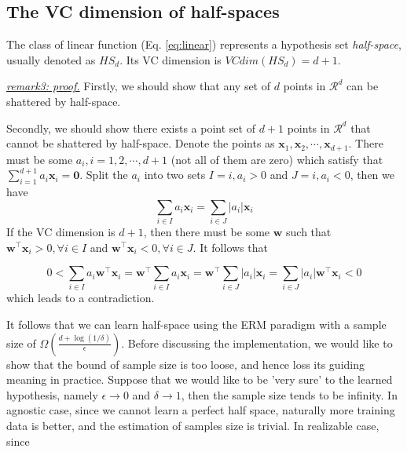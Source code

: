 \documentclass{article}
\begin{document}
	\subsection{The VC dimension of half-spaces}
	
	The class of linear function (Eq. \ref{eq:linear}) represents a hypothesis set  \textit{half-space}, usually denoted as $HS_d$. Its VC dimension is $VCdim(HS_d)=d+1$.  

	\vspace{2mm}
	\begin{scriptsize}
	\begin{spacing}{1.2}
	{\sffamily
	\noindent\textit{\underline{remark3: proof.}} Firstly, we should show that any set of $d$ points in $\mathcal{R}^d$ can be shattered by half-space. 
	
	Secondly, we should show there exists a point set of $d+1$ points in $\mathcal{R}^{d}$ that cannot be shattered by half-space. Denote the points as $\mathbf{x}_1, \mathbf{x}_2, \cdots, \mathbf{x}_{d+1}$. There must be some $a_i, i=1,2,\cdots,d+1$ (not all of them are zero) which satisfy that $\sum_{i=1}^{d+1} a_i \mathbf{x}_i = \mathbf{0}$. Split the $a_i$ into two sets $I={i,a_i>0}$ and $J={i,a_i<0}$, then we have 
	\begin{equation*}
	\sum_{i\in I} a_i \mathbf{x}_i = \sum_{i \in J} |a_i| \mathbf{x}_i
	\end{equation*}
If the VC dimension is $d+1$, then there must be some $\mathbf{w}$ such that $\mathbf{w}^\top \mathbf{x}_i > 0, \forall i \in I$ and $\mathbf{w}^\top \mathbf{x}_i < 0, \forall i \in J$. It follows that
	
	\begin{equation*}
	0 < \sum_{i \in I} a_i \mathbf{w}^\top \mathbf{x}_i = \mathbf{w}^\top  \sum_{i \in I} a_i \mathbf{x}_i = \mathbf{w}^\top  \sum_{i \in J} |a_i| \mathbf{x}_i =  \sum_{i \in J} |a_i| \mathbf{w}^\top \mathbf{x}_i  < 0
	\end{equation*}
which leads to a contradiction.}
	\end{spacing}
	\end{scriptsize}
	
	It follows that we can learn half-space using the ERM paradigm with a sample size of $\Omega(\frac{d+\log(1/\delta)}{\epsilon})$. Before discussing the implementation, we would like to show that the bound of sample size is too loose, and hence loss its guiding meaning in practice.  Suppose that we would like to be 'very sure' to the learned hypothesis, namely $\epsilon\rightarrow 0$ and $\delta\rightarrow 1$, then the sample size tends to be infinity. In agnostic case, since we cannot learn  a perfect half space, naturally  more training data is better, and the estimation of samples size is trivial. In realizable case, since 
	
\end{document}
